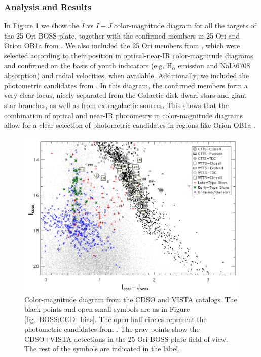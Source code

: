 \documentclass[12pt]{article}
\begin{document}
\subsubsection{Analysis and Results}
\label{sec_BOSS:results}
In Figure \ref{fig_BOSS:IvsI-J} we show the $I$ vs $I-J$ color-magnitude diagram for all the targets of the 25 Ori BOSS plate, together with the confirmed members in 25 Ori and Orion OB1a from \citet[][]{Briceno2005, Briceno2007, Downes2014, Downes2015}. We also included the 25 Ori members from \citet{Briceno2018}, which were selected according to their position in optical-near-IR color-magnitude diagrams and confirmed on the basis of youth indicators (e.g. H$_\alpha$ emission and NaI$\lambda6708$ absorption) and radial velocities, when available. Additionally, we included the photometric candidates from \citet{Hernandez2007b, Downes2014}. In this diagram, the confirmed members form a very clear locus, nicely separated from the Galactic disk dwarf stars and giant star branches, as well as from extragalactic sources. This shows that the combination of optical and near-IR photometry in color-magnitude diagrams allow for a clear selection of photometric candidates in regions like Orion OB1a \citep[e.g.,][]{Downes2014}.

\begin{figure}[ht!]
	\centering
	\includegraphics[width=1.\textwidth]{f3.pdf}
	\caption[Color-magnitude diagram of the targets in the 25 Ori BOSS plate]{Color-magnitude diagram from the CDSO and VISTA catalogs. The black points and open small symbols are as in Figure \ref{fig_BOSS:CCD_bias}. The open half circles represent the photometric candidates from \citet{Hernandez2007b}. The gray points show the CDSO+VISTA detections in the 25 Ori BOSS plate field of view. The rest of the symbols are indicated in the label.}
	\label{fig_BOSS:IvsI-J}
\end{figure}
\end{document}
